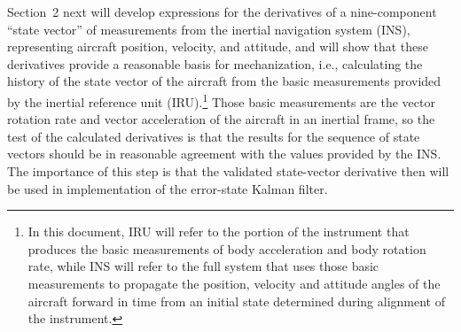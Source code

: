 \documentclass[12pt,twoside,english,12pt,twoside,english]{article}\usepackage[]{graphicx}\usepackage[]{color}
\let\OrgIndex\index
\renewcommand*{\index}[1]{\OrgIndex{#1}}
\begin{document}
Section~2 next will develop expressions for the derivatives
of a nine-component ``state vector'' of measurements
from the inertial navigation system
(INS), representing aircraft position, velocity, and attitude, and
will show that these derivatives provide a reasonable basis for mechanization,
i.e., calculating the history of the state vector
of the aircraft from the basic measurements
provided by the inertial reference unit
(IRU).\footnote{In this document, IRU will refer to the portion of the instrument
that produces the basic measurements
of body acceleration and body rotation rate, while INS
will refer to the full system that uses those basic measurements
to propagate the position, velocity and attitude angles
of the aircraft forward in time from an initial state determined during
alignment of the instrument.} Those basic measurements
are the vector rotation rate and vector acceleration
of the aircraft in an inertial frame,
so the test of the calculated derivatives
is that the results for the sequence of state vectors
should be in reasonable agreement with the values provided by the
INS. The importance of this step is that the validated state-vector
derivative then will be used in implementation
of the error-state Kalman filter.
\end{document}

